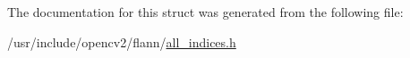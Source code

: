 The documentation for this struct was generated from the following file\-:\begin{DoxyCompactItemize}
\item 
/usr/include/opencv2/flann/\hyperlink{all__indices_8h}{all\-\_\-indices.\-h}\end{DoxyCompactItemize}
